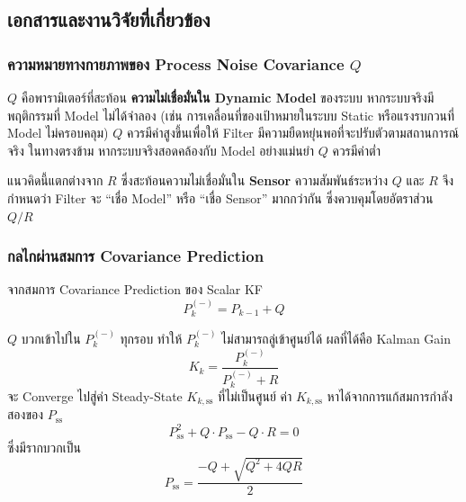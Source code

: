 \subsection{เอกสารและงานวิจัยที่เกี่ยวข้อง}

\subsubsection{ความหมายทางกายภาพของ Process Noise Covariance $Q$}

$Q$ คือพารามิเตอร์ที่สะท้อน \textbf{ความไม่เชื่อมั่นใน Dynamic Model} ของระบบ
หากระบบจริงมีพฤติกรรมที่ Model ไม่ได้จำลอง (เช่น การเคลื่อนที่ของเป้าหมายในระบบ Static
หรือแรงรบกวนที่ Model ไม่ครอบคลุม) $Q$ ควรมีค่าสูงขึ้นเพื่อให้ Filter
มีความยืดหยุ่นพอที่จะปรับตัวตามสถานการณ์จริง ในทางตรงข้าม
หากระบบจริงสอดคล้องกับ Model อย่างแม่นยำ $Q$ ควรมีค่าต่ำ

แนวคิดนี้แตกต่างจาก $R$ ซึ่งสะท้อนความไม่เชื่อมั่นใน \textbf{Sensor}
ความสัมพันธ์ระหว่าง $Q$ และ $R$ จึงกำหนดว่า Filter จะ ``เชื่อ Model''
หรือ ``เชื่อ Sensor'' มากกว่ากัน ซึ่งควบคุมโดยอัตราส่วน $Q/R$

\subsubsection{กลไกผ่านสมการ Covariance Prediction}

จากสมการ Covariance Prediction ของ Scalar KF
\begin{equation}
    P_k^{(-)} = P_{k-1} + Q
    \label{eq:cov_pred_detail}
\end{equation}

$Q$ บวกเข้าไปใน $P_k^{(-)}$ ทุกรอบ ทำให้ $P_k^{(-)}$ ไม่สามารถลู่เข้าศูนย์ได้
ผลที่ได้คือ Kalman Gain
\begin{equation}
    K_k = \frac{P_k^{(-)}}{P_k^{(-)} + R}
    \label{eq:scalar_gain_exp3}
\end{equation}
จะ Converge ไปสู่ค่า Steady-State $K_{k,\mathrm{ss}}$ ที่ไม่เป็นศูนย์
ค่า $K_{k,\mathrm{ss}}$ หาได้จากการแก้สมการกำลังสองของ $P_\mathrm{ss}$
\begin{equation}
    P_\mathrm{ss}^2 + Q \cdot P_\mathrm{ss} - Q \cdot R = 0
    \label{eq:p_ss_quadratic}
\end{equation}
ซึ่งมีรากบวกเป็น
\begin{equation}
    P_\mathrm{ss} = \frac{-Q + \sqrt{Q^2 + 4QR}}{2}
    \label{eq:p_ss_solution}
\end{equation}

